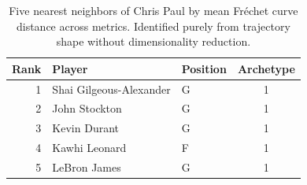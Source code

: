 \begin{table}[htbp]
  \centering\small
  \begin{tabular}{rllc}
    \toprule
    Rank & Player & Position & Archetype \\
    \midrule
    1 & Shai Gilgeous-Alexander & G & 1 \\
    2 & John Stockton & G & 1 \\
    3 & Kevin Durant & G & 1 \\
    4 & Kawhi Leonard & F & 1 \\
    5 & LeBron James & G & 1 \\
    \bottomrule
  \end{tabular}
  \caption{Five nearest neighbors of Chris Paul by mean Fr\'{e}chet curve distance across metrics. Identified purely from trajectory shape without dimensionality reduction.}
  \label{tab:Chris_Paul_frechet_curve_neighbors}
\end{table}

